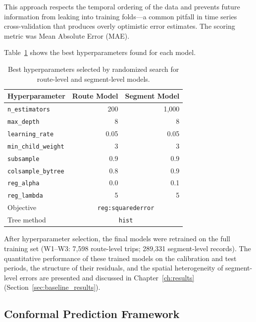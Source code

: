 This approach respects the temporal ordering of the data and prevents future information from leaking into training folds—a common pitfall in time series cross-validation that produces overly optimistic error estimates. The scoring metric was Mean Absolute Error (MAE).

Table~\ref{tab:best_hyperparams} shows the best hyperparameters found for each model.

\begin{table}[htbp]
\centering
\caption{Best hyperparameters selected by randomized search for route-level and segment-level models.}
\label{tab:best_hyperparams}
\begin{tabular}{lrr}
\toprule
\textbf{Hyperparameter} & \textbf{Route Model} & \textbf{Segment Model} \\
\midrule
\texttt{n\_estimators} & 200 & 1,000 \\
\texttt{max\_depth} & 8 & 8 \\
\texttt{learning\_rate} & 0.05 & 0.05 \\
\texttt{min\_child\_weight} & 3 & 3 \\
\texttt{subsample} & 0.9 & 0.9 \\
\texttt{colsample\_bytree} & 0.8 & 0.9 \\
\texttt{reg\_alpha} & 0.0 & 0.1 \\
\texttt{reg\_lambda} & 5 & 5 \\
Objective & \multicolumn{2}{c}{\texttt{reg:squarederror}} \\
Tree method & \multicolumn{2}{c}{\texttt{hist}} \\
\bottomrule
\end{tabular}
\end{table}

After hyperparameter selection, the final models were retrained on the full training set (W1--W3: 7,598 route-level trips; 289,331 segment-level records). The quantitative performance of these trained models on the calibration and test periods, the structure of their residuals, and the spatial heterogeneity of segment-level errors are presented and discussed in Chapter~\ref{ch:results} (Section~\ref{sec:baseline_results}).

\subsection{Conformal Prediction Framework}
\label{subsec:conformal_prediction}

